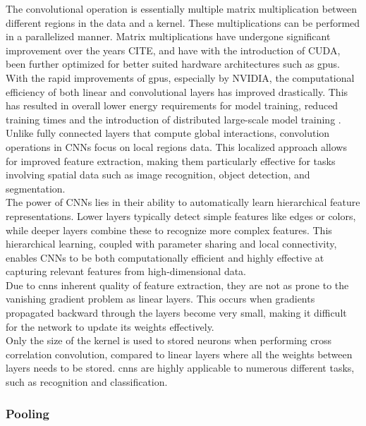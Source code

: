 The convolutional operation is essentially multiple matrix multiplication between different regions in the data and a kernel. These multiplications can be performed in a parallelized manner. Matrix multiplications have undergone significant improvement over the years CITE, and have with the introduction of CUDA, been further optimized for better suited hardware architectures such as \acrshort{gpu}s. With the rapid improvements of \acrshort{gpu}s, especially by NVIDIA, the computational efficiency of both linear and convolutional layers has improved drastically. This has resulted in overall lower energy requirements for model training, reduced training times and the introduction of distributed large-scale model training \cite{mungoli2023scalable}. \\ 

Unlike fully connected layers that compute global interactions, convolution operations in CNNs focus on local regions data. This localized approach allows for improved feature extraction, making them particularly effective for tasks involving spatial data such as image recognition, object detection, and segmentation. \\



The power of CNNs lies in their ability to automatically learn hierarchical feature representations. Lower layers typically detect simple features like edges or colors, while deeper layers combine these to recognize more complex features. This hierarchical learning, coupled with parameter sharing and local connectivity, enables CNNs to be both computationally efficient and highly effective at capturing relevant features from high-dimensional data. \\

Due to \acrshort{cnn}s inherent quality of feature extraction, they are not as prone to the vanishing gradient problem as linear layers. This occurs when gradients propagated backward through the layers become very small, making it difficult for the network to update its weights effectively. \\

Only the size of the kernel is used to stored neurons when performing cross correlation convolution, compared to linear layers where all the weights between layers needs to be stored. \acrshort{cnn}s are highly applicable to numerous different tasks, such as recognition and classification. \\

\subsubsection{Pooling}

